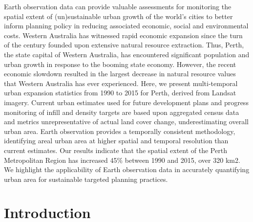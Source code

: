 \documentclass[]{book}
\begin{document}
Earth observation data can provide valuable assessments for monitoring
the spatial extent of (un)sustainable urban growth of the world's cities
to better inform planning policy in reducing associated economic, social
and environmental costs. Western Australia has witnessed rapid economic
expansion since the turn of the century founded upon extensive natural
resource extraction. Thus, Perth, the state capital of Western
Australia, has encountered significant population and urban growth in
response to the booming state economy. However, the recent economic
slowdown resulted in the largest decrease in natural resource values
that Western Australia has ever experienced. Here, we present
multi-temporal urban expansion statistics from 1990 to 2015 for Perth,
derived from Landsat imagery. Current urban estimates used for future
development plans and progress monitoring of infill and density targets
are based upon aggregated census data and metrics unrepresentative of
actual land cover change, underestimating overall urban area. Earth
observation provides a temporally consistent methodology, identifying
areal urban area at higher spatial and temporal resolution than current
estimates. Our results indicate that the spatial extent of the Perth
Metropolitan Region has increased 45\% between 1990 and 2015, over 320
km2. We highlight the applicability of Earth observation data in
accurately quantifying urban area for sustainable targeted planning
practices.

\section{Introduction}\label{introduction-3}
\end{document}
